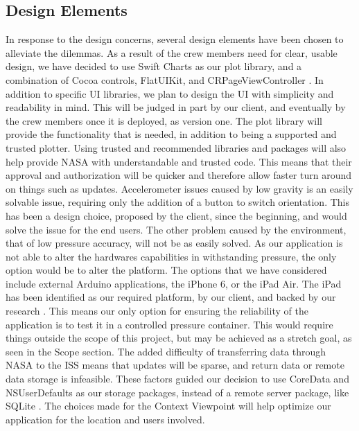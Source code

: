 \documentclass[onecolumn, draftclsnofoot,10pt, compsoc]{IEEEtran}
\begin{document}
\subsection{Design Elements}
In response to the design concerns, several design elements have been chosen to alleviate the dilemmas.
As a result of the crew members need for clear, usable design, we have decided to use Swift Charts as our plot library, and a combination of Cocoa controls, FlatUIKit, and  CRPageViewController \cite{techDocRaichart}.
In addition to specific UI libraries, we plan to design the UI with simplicity and readability in mind.
This will be judged in part by our client, and eventually by the crew members once it is deployed, as version one.
The plot library will provide the functionality that is needed, in addition to being a supported and trusted plotter.
Using trusted and recommended libraries and packages will also help provide NASA with understandable and trusted code.
This means that their approval and authorization will be quicker and therefore allow faster turn around on things such as updates.
Accelerometer issues caused by low gravity is an easily solvable issue, requiring only the addition of a button to switch orientation.
This has been a design choice, proposed by the client, since the beginning, and would solve the issue for the end users.
The other problem caused by the environment, that of low pressure accuracy, will not be as easily solved.
As our application is not able to alter the hardwares capabilities in withstanding pressure, the only option would be to alter the platform.
The options that we have considered include external Arduino applications, the iPhone 6, or the iPad Air.
The iPad has been identified as our required platform, by our client, and backed by our research \cite{techDocRaichart}.
This means our only option for ensuring the reliability of the application is to test it in a controlled pressure container.
This would require things outside the scope of this project, but may be achieved as a stretch goal, as seen in the Scope section.
The added difficulty of transferring data through NASA to the ISS means that updates will be sparse, and return data or remote data storage is infeasible.
These factors guided our decision to use CoreData and NSUserDefaults as our storage packages, instead of a remote server package, like SQLite \cite{techDocShepherd}.
The choices made for the Context Viewpoint will help optimize our application for the location and users involved.
\end{document}
